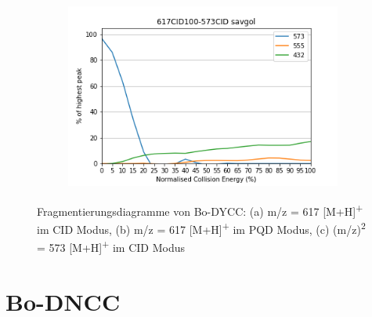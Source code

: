 \begin{figure}[!htbp]
  \begin{subfigure}[b]{0.5\textwidth}
    \includegraphics[width=\textwidth]{content/Anhang/ESIMS/Bo-DYCC/617CID100-573CID-573savgol.png}
    \caption{}
  \end{subfigure}
  
  \caption[Fragmentierungsdiagramme von Bo-DYCC, Quelle: Autor]{Fragmentierungsdiagramme von Bo-DYCC: (a) m/z = 617 [M+H]\textsuperscript{+} im CID Modus, (b) m/z = 617 [M+H]\textsuperscript{+} im PQD Modus, (c) (m/z)\textsuperscript{2} = 573 [M+H]\textsuperscript{+} im CID Modus}
\end{figure}

\pagebreak
\section{Bo-DNCC}

